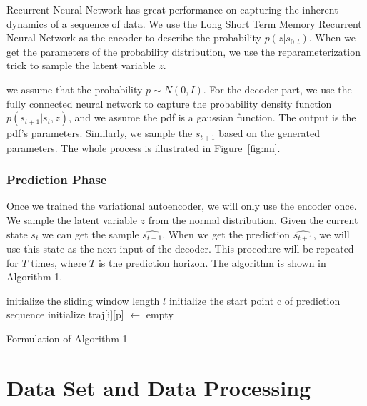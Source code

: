 \documentclass[conference]{IEEEtran}
\begin{document}
Recurrent Neural Network has great performance on capturing the inherent dynamics of a sequence of data. We use the Long Short Term Memory Recurrent Neural Network as the encoder to describe the probability $p(z | s_{0:t})$. When we get the parameters of the probability distribution, we use the reparameterization trick to sample the latent variable $z$. 

we assume that the probability $p \sim N(0, I)$. For the decoder part, we use the fully connected neural network to capture the probability density function $p(s_{t+1} | s_{t}, z)$, and we assume the pdf is a gaussian function. The output is the pdf's parameters. Similarly, we sample the $s_{t+1}$ based on the generated parameters. The whole process is illustrated in Figure~\ref{fig:nn}.

\subsubsection{Prediction Phase}

Once we trained the variational autoencoder, we will only use the encoder once. We sample the latent variable $z$ from the normal distribution. Given the current state $s_{t}$ we can get the sample $\hat{s_{t+1}}$. When we get the prediction $\hat{s_{t+1}}$, we will use this state as the next input of the decoder. This procedure will be repeated for $T$ times, where  $T$ is the prediction horizon. The algorithm is shown in Algorithm 1.



\begin{algorithm}
initialize the sliding window length $l$\;
initialize the start point c of prediction sequence\;  
initialize traj[i][p] $\gets$ empty\;
\caption{Formulation of Algorithm 1}
\end{algorithm}

\section{Data Set and Data Processing}
\end{document}
